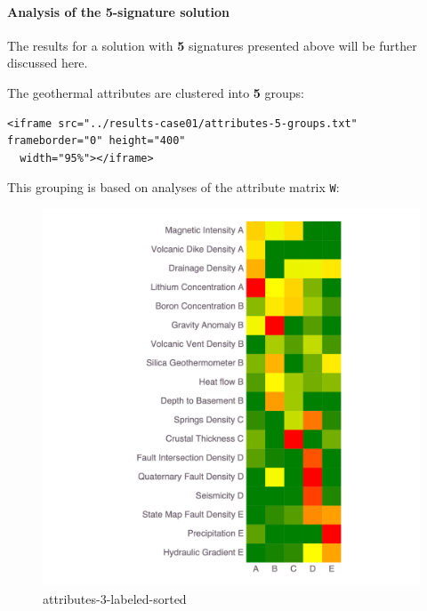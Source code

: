 \documentclass[11pt]{article}
\begin{document}
    \begin{Verbatim}[commandchars=\\\{\}]

    \end{Verbatim}

    \hypertarget{analysis-of-the-5-signature-solution}{%
\paragraph{Analysis of the 5-signature
solution}\label{analysis-of-the-5-signature-solution}}

The results for a solution with \textbf{5} signatures presented above
will be further discussed here.

The geothermal attributes are clustered into \textbf{5} groups:

\begin{verbatim}
<iframe src="../results-case01/attributes-5-groups.txt" frameborder="0" height="400"
  width="95%"></iframe>
\end{verbatim}

This grouping is based on analyses of the attribute matrix \texttt{W}:

\begin{figure}
\centering
\includegraphics{../figures-case01/attributes-5-labeled-sorted.png}
\caption{attributes-3-labeled-sorted}
\end{figure}
\end{document}

